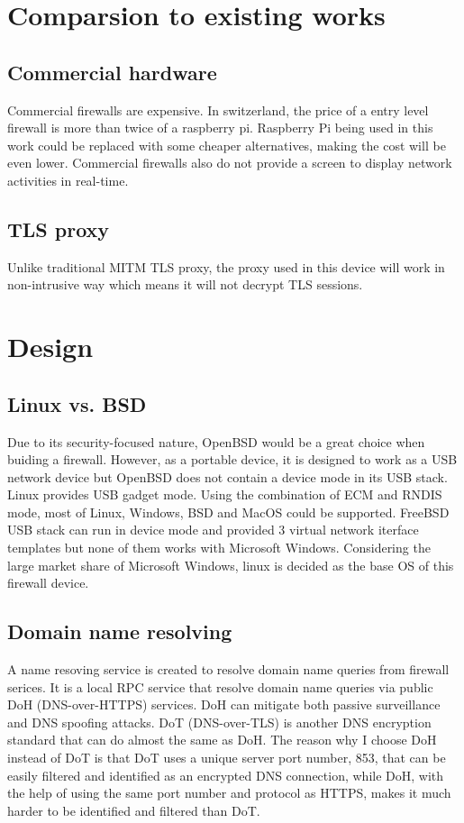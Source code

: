 \documentclass[mscthesis]{usiinfthesis}
\begin{document}
\chapter{Comparsion to existing works}
\section{Commercial hardware}
Commercial firewalls are expensive. In switzerland, the price of a entry
level firewall is more than twice of a raspberry pi. Raspberry Pi being
used in this work could be replaced with some cheaper alternatives, making
the cost will be even lower. Commercial firewalls also do not provide a
screen to display network activities in real-time.

\section{TLS proxy}
Unlike traditional MITM TLS proxy, the proxy used in this device will work
in non-intrusive way which means it will not decrypt TLS sessions.

\chapter[Design]{Design}

\section{Linux vs. BSD}

Due to its security-focused nature, OpenBSD would be a great choice when buiding a firewall. However, as a portable device, it is designed to work as a USB network device but OpenBSD does not contain a device mode in its USB stack. Linux provides USB gadget mode. Using the combination of ECM and RNDIS mode, most of Linux, Windows, BSD and MacOS could be supported. FreeBSD USB stack can run in device mode and provided 3 virtual network iterface templates but none of them works with Microsoft Windows\citet{freebsdhb:usb}. Considering the large market share of Microsoft Windows, linux is decided as the base OS of this firewall device.

\section{Domain name resolving}

A name resoving service is created to resolve domain name queries from firewall serices. It is a local RPC service that resolve domain name queries via public DoH (DNS-over-HTTPS) services. DoH can mitigate both passive surveillance and DNS spoofing attacks\citet{rfc:doh8}. DoT (DNS-over-TLS) is another DNS encryption standard that can do almost the same as DoH. The reason why I choose DoH instead of DoT is that DoT uses a unique server port number, 853, that can be easily filtered and identified as an encrypted DNS connection, while DoH, with the help of using the same port number and protocol as HTTPS, makes it much harder to be identified and filtered than DoT.
\end{document}
